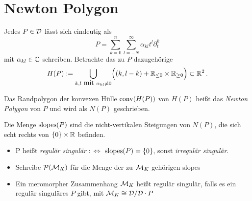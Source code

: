 \section{Newton Polygon} %
\begin{comment}
Quelle: sabba?\\
sabbah mach alles formal, barbara mach alles konvergent
\end{comment}
Jedes $P\in \mathcal{D}$ lässt sich eindeutig als
\[ P=\sum^{n}_{k=0}{\sum^{\infty}_{l=-N}{\alpha_{kl}t^l\partial_t^k}} \]
mit $\alpha_{kl}\in\mathbb{C}$ schreiben. Betrachte das zu $P$ dazugehörige
\[ H(P):=\underset{k,l\mbox{ mit }\alpha_{kl}\neq0}{\bigcup}\Big( (k,l-k) +
\mathbb{R}_{\leq 0}\times \mathbb{R}_{\geq 0} \Big) \subset \mathbb{R}^2 \,. \]
\begin{comment}
Bei Sabbah: $H\subset \N\times\Z$ und dann konvexe Hülle davon in $\R^2$
\end{comment}

\begin{defn} %
Das Randpolygon der konvexen Hülle $\operatorname{conv}(H(P))$ von $H(P)$ heißt das
\emph{Newton Polygon} von $P$ und wird als $N(P)$ geschrieben.
\end{defn}

\begin{defn} %
Die Menge $\operatorname{slopes}(P)$ sind die nicht-vertikalen Steigungen von $N(P)$, die
sich echt rechts von $\{0\}\times\mathbb{R}$ befinden.\\ %
\begin{itemize}
\item P heißt \emph{regulär singulär} $:\Leftrightarrow$
$\operatorname{slopes}(P)=\{0\}$, sonst \emph{irregulär singulär}.
\item Schreibe $\mathcal{P}(\mathcal{M}_K)$ für die Menge der zu $\mathcal{M}_K$ gehörigen slopes
\item Ein meromorpher Zusammenhang $\mathcal{M}_K$ heißt regulär singulär, falls es
ein regulär singuläres $P$ gibt, mit $\mathcal{M}_K\cong\mathcal{D}/\mathcal{D}\cdot P$
\end{itemize}
\end{defn}

